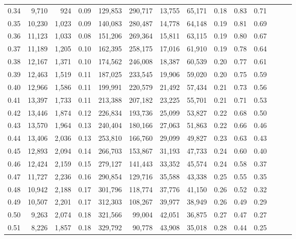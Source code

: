 \begin{tabular}{rrrrrrrrrrrrrr}
0.34 &   9,710 &    924 &  0.09 &  129,853 &  290,717 &  13,755 &  65,171 &  0.18 &  0.83 &      0.71 \\
0.35 &  10,230 &  1,023 &  0.09 &  140,083 &  280,487 &  14,778 &  64,148 &  0.19 &  0.81 &      0.69 \\
0.36 &  11,123 &  1,033 &  0.08 &  151,206 &  269,364 &  15,811 &  63,115 &  0.19 &  0.80 &      0.67 \\
0.37 &  11,189 &  1,205 &  0.10 &  162,395 &  258,175 &  17,016 &  61,910 &  0.19 &  0.78 &      0.64 \\
0.38 &  12,167 &  1,371 &  0.10 &  174,562 &  246,008 &  18,387 &  60,539 &  0.20 &  0.77 &      0.61 \\
0.39 &  12,463 &  1,519 &  0.11 &  187,025 &  233,545 &  19,906 &  59,020 &  0.20 &  0.75 &      0.59 \\
0.40 &  12,966 &  1,586 &  0.11 &  199,991 &  220,579 &  21,492 &  57,434 &  0.21 &  0.73 &      0.56 \\
0.41 &  13,397 &  1,733 &  0.11 &  213,388 &  207,182 &  23,225 &  55,701 &  0.21 &  0.71 &      0.53 \\
0.42 &  13,446 &  1,874 &  0.12 &  226,834 &  193,736 &  25,099 &  53,827 &  0.22 &  0.68 &      0.50 \\
0.43 &  13,570 &  1,964 &  0.13 &  240,404 &  180,166 &  27,063 &  51,863 &  0.22 &  0.66 &      0.46 \\
0.44 &  13,406 &  2,036 &  0.13 &  253,810 &  166,760 &  29,099 &  49,827 &  0.23 &  0.63 &      0.43 \\
0.45 &  12,893 &  2,094 &  0.14 &  266,703 &  153,867 &  31,193 &  47,733 &  0.24 &  0.60 &      0.40 \\
0.46 &  12,424 &  2,159 &  0.15 &  279,127 &  141,443 &  33,352 &  45,574 &  0.24 &  0.58 &      0.37 \\
0.47 &  11,727 &  2,236 &  0.16 &  290,854 &  129,716 &  35,588 &  43,338 &  0.25 &  0.55 &      0.35 \\
0.48 &  10,942 &  2,188 &  0.17 &  301,796 &  118,774 &  37,776 &  41,150 &  0.26 &  0.52 &      0.32 \\
0.49 &  10,507 &  2,201 &  0.17 &  312,303 &  108,267 &  39,977 &  38,949 &  0.26 &  0.49 &      0.29 \\
0.50 &   9,263 &  2,074 &  0.18 &  321,566 &   99,004 &  42,051 &  36,875 &  0.27 &  0.47 &      0.27 \\
0.51 &   8,226 &  1,857 &  0.18 &  329,792 &   90,778 &  43,908 &  35,018 &  0.28 &  0.44 &      0.25 \\

\end{tabular}

